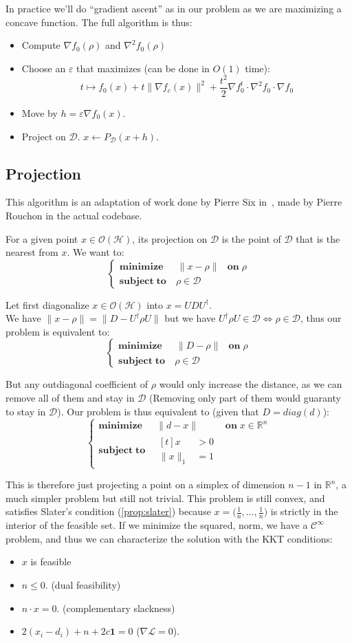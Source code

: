 \documentclass[10pt,a4paper]{report}
\theoremstyle{plain}
\theoremstyle{definition}
\theoremstyle{remark}
\newcommand{\R}{\ensuremath{\mathbb{R}}}
\renewcommand{\leq}{\leqslant}
\newcommand{\class}[1]{{\mathscr{C}^{#1}}}
\newcommand{\minim}[3]{\begin{cases}
    \mathbf{minimize}\;\,\quad #1& \mathbf{on}\; #2\\
    \mathbf{subject\;to}\quad #3
  \end{cases}}
\newcommand{\minima}[3]{\begin{cases}
    \mathbf{minimize}\;\,\quad #1& \mathbf{on}\; #2\\
    \mathbf{subject\;to}\quad \begin{aligned}[t]#3\end{aligned}
  \end{cases}}
\begin{document}
In practice we'll do ``gradient ascent'' as in our problem as we are maximizing a
concave function. The full algorithm is thus:

\begin{itemize}
\item Compute $\nabla f_0(\rho)$ and $\nabla^2 f_0(\rho)$
\item Choose an $\varepsilon$ that maximizes (can be done in $O(1)$ time):
  \[t \mapsto f_0(x) + t\|\nabla f_c(x)\|^2 + \frac {t^2} 2 \nabla f_0^t \cdot
  \nabla^2\!f_0 \cdot \nabla f_0\]
\item Move by $h = \varepsilon \nabla f_0(x)$.
\item Project on $\mathcal{D}$. $x \leftarrow P_\mathcal{D}(x+h)$.
\end{itemize}

\subsection{Projection}\label{ssec:proj}

This algorithm is an adaptation of work done by Pierre Six in~\cite{SPHD16},
made by Pierre Rouchon in the actual codebase.

For a given point $x \in \mathcal{O}(\mathcal{H})$, its projection on
$\mathcal{D}$ is the point of $\mathcal{D}$ that is the nearest from $x$. We
want to:
\[\minim{\|x - \rho\|}{\rho}{\rho \in \mathcal{D}}\]

Let first diagonalize $x \in \mathcal{O}(\mathcal{H})$ into $x = UDU^\dagger$.\\
We have $\|x - \rho\| = \|D - U^\dagger \rho U\|$ but we have
$U^\dagger \rho U \in \mathcal{D}\iff
\rho \in \mathcal{D}$, thus our problem is equivalent to:
\[\minim{\|D - \rho\|}{\rho}{\rho \in \mathcal{D}}\]

But any outdiagonal coefficient of $\rho$ would only increase the distance, as
we can remove all of them and stay in $\mathcal{D}$ (Removing only part of them
would guaranty to stay in $\mathcal{D}$). Our problem is thus equivalent to
(given that $D = diag(d)$):
\[\minima{\|d - x\|}{x \in\R^n}{ x&>0\\ \|x\|_1 &= 1}\]

This is therefore just projecting a point on a simplex of dimension $n-1$ in
$\R^n$, a much simpler problem but still not trivial. This problem is still
convex, and satisfies Slater's condition (\ref{prop:slater}) because $x = \big(\frac1n,\ldots,\frac1n\big)$
is strictly in the interior of the feasible set. If we minimize the squared,
norm, we have a $\class \infty$ problem, and thus we can characterize the
solution with the KKT conditions:
\begin{itemize}
\item $x$ is feasible
\item $n \leq 0$. (dual feasibility)
\item $n \cdot x = 0$. (complementary slackness)
\item $\displaystyle 2(x_i-d_i) + n + 2c \mathbf 1 = 0$ ($\nabla \mathcal{L} = 0$).
\end{itemize}
\end{document}
